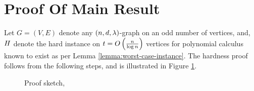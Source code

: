 \documentclass[11pt]{article}
\begin{document}
\section{Proof Of Main Result}
\label{sec:main-proof}

Let $G=(V,E)$ denote any $(n, d, \lambda)$-graph on an odd number of vertices, and,  $H$ denote the hard instance on $t=O\left(\frac{n}{\log n}\right)$ vertices for polynomial calculus known to exist as per Lemma \ref{lemma:worst-case-instance}.
The hardness proof follows from the following steps, and is illustrated in Figure \ref{fig:proof-outline}.


\begin{figure}
  \caption{Proof sketch, }
	\label{fig:proof-outline}
\end{figure}
\end{document}
